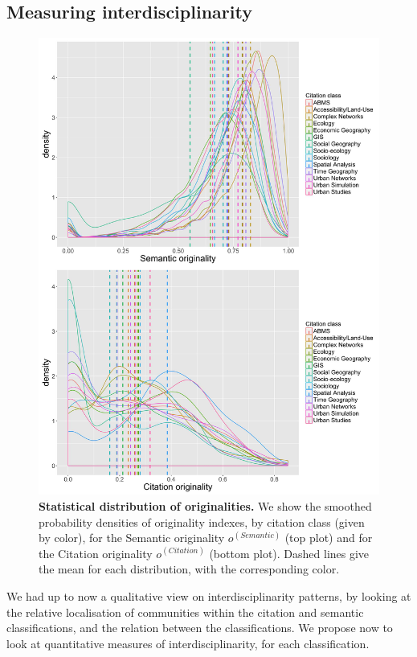 \documentclass[10pt]{article}
\begin{document}
\subsection*{Measuring interdisciplinarity}
\label{subsec:interdisc}


\begin{figure}
\centering
\includegraphics[width=\linewidth]{Fig11.jpg}
\caption{\textbf{Statistical distribution of originalities.} We show the smoothed probability densities of originality indexes, by citation class (given by color), for the Semantic originality $o^{(Semantic)}$ (top plot) and for the Citation originality $o^{(Citation)}$ (bottom plot). Dashed lines give the mean for each distribution, with the corresponding color.}
\label{fig:firstorderint}
\end{figure}


We had up to now a qualitative view on interdisciplinarity patterns, by looking at the relative localisation of communities within the citation and semantic classifications, and the relation between the classifications. We propose now to look at quantitative measures of interdisciplinarity, for each classification.
\end{document}
